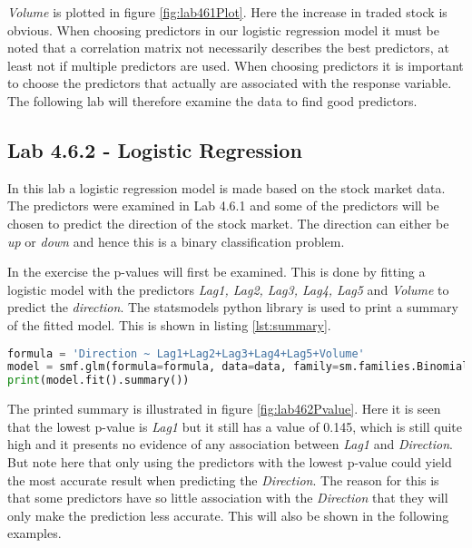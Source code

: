 \FloatBarrier

 
\emph{Volume} is plotted in figure \ref{fig:lab461Plot}. Here the increase in traded stock is obvious. When choosing predictors in our logistic regression model it must be noted that a correlation matrix not necessarily describes the best predictors, at least not if multiple predictors are used. When choosing predictors it is important to choose the predictors that actually are associated with the response variable. The following lab will therefore examine the data to find good predictors.

\subsection{Lab 4.6.2 - Logistic Regression}
\label{sec:lab462}
In this lab a logistic regression model is made based on the stock market data. The predictors were examined in Lab 4.6.1 and some of the predictors will be chosen to predict the direction of the stock market. The direction can either be \emph{up} or \emph{down} and hence this is a binary classification problem.

In the exercise the p-values will first be examined. This is done by fitting a logistic model with the predictors \emph{Lag1, Lag2, Lag3, Lag4, Lag5} and \emph{Volume} to predict the \emph{direction}. The statsmodels python library is used to print a summary of the fitted model. This is shown in listing \ref{lst:summary}.

\begin{lstlisting}[language=Python, label=lst:summary, caption=Printing summary]
formula = 'Direction ~ Lag1+Lag2+Lag3+Lag4+Lag5+Volume'
model = smf.glm(formula=formula, data=data, family=sm.families.Binomial())
print(model.fit().summary())
\end{lstlisting}

\FloatBarrier

The printed summary is illustrated in figure \ref{fig:lab462Pvalue}. Here it is  seen that the lowest p-value is \emph{Lag1} but it still has a value of 0.145, which is still quite high and it presents no evidence of any association between \emph{Lag1} and \emph{Direction}. But note here that only using the predictors with the lowest p-value could yield the most accurate result when predicting the \emph{Direction}. The reason for this is that some predictors have so little association with the \emph{Direction} that they will only make the prediction less accurate. This will also be shown in the following examples.


